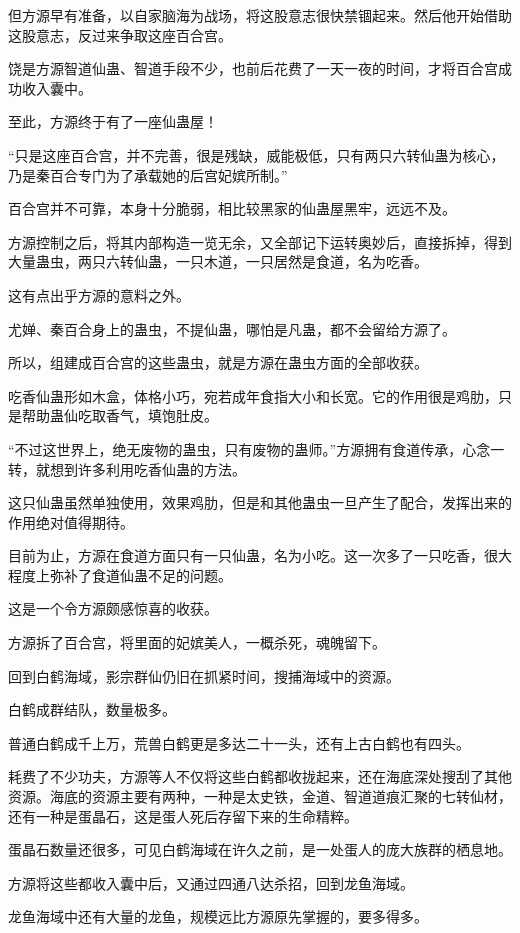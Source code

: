 \begin{this_body}
但方源早有准备，以自家脑海为战场，将这股意志很快禁锢起来。然后他开始借助这股意志，反过来争取这座百合宫。

饶是方源智道仙蛊、智道手段不少，也前后花费了一天一夜的时间，才将百合宫成功收入囊中。

至此，方源终于有了一座仙蛊屋！

“只是这座百合宫，并不完善，很是残缺，威能极低，只有两只六转仙蛊为核心，乃是秦百合专门为了承载她的后宫妃嫔所制。”

百合宫并不可靠，本身十分脆弱，相比较黑家的仙蛊屋黑牢，远远不及。

方源控制之后，将其内部构造一览无余，又全部记下运转奥妙后，直接拆掉，得到大量蛊虫，两只六转仙蛊，一只木道，一只居然是食道，名为吃香。

这有点出乎方源的意料之外。

尤婵、秦百合身上的蛊虫，不提仙蛊，哪怕是凡蛊，都不会留给方源了。

所以，组建成百合宫的这些蛊虫，就是方源在蛊虫方面的全部收获。

吃香仙蛊形如木盒，体格小巧，宛若成年食指大小和长宽。它的作用很是鸡肋，只是帮助蛊仙吃取香气，填饱肚皮。

“不过这世界上，绝无废物的蛊虫，只有废物的蛊师。”方源拥有食道传承，心念一转，就想到许多利用吃香仙蛊的方法。

这只仙蛊虽然单独使用，效果鸡肋，但是和其他蛊虫一旦产生了配合，发挥出来的作用绝对值得期待。

目前为止，方源在食道方面只有一只仙蛊，名为小吃。这一次多了一只吃香，很大程度上弥补了食道仙蛊不足的问题。

这是一个令方源颇感惊喜的收获。

方源拆了百合宫，将里面的妃嫔美人，一概杀死，魂魄留下。

回到白鹤海域，影宗群仙仍旧在抓紧时间，搜捕海域中的资源。

白鹤成群结队，数量极多。

普通白鹤成千上万，荒兽白鹤更是多达二十一头，还有上古白鹤也有四头。

耗费了不少功夫，方源等人不仅将这些白鹤都收拢起来，还在海底深处搜刮了其他资源。海底的资源主要有两种，一种是太史铁，金道、智道道痕汇聚的七转仙材，还有一种是蛋晶石，这是蛋人死后存留下来的生命精粹。

蛋晶石数量还很多，可见白鹤海域在许久之前，是一处蛋人的庞大族群的栖息地。

方源将这些都收入囊中后，又通过四通八达杀招，回到龙鱼海域。

龙鱼海域中还有大量的龙鱼，规模远比方源原先掌握的，要多得多。


\end{this_body}
